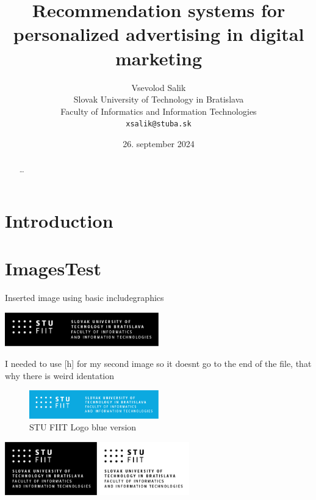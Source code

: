 \documentclass[10pt,twoside,english,a4paper]{article}
\title{Recommendation systems for personalized advertising in digital marketing} %
\author{Vsevolod Salik\\[2pt]
	{\small Slovak University of Technology in Bratislava }\\
	{\small Faculty of Informatics and Information Technologies }\\
	{\small \texttt{xsalik@stuba.sk}}
	}
\date{\small 26. september 2024} %
\begin{document}
\maketitle


\begin{abstract}
\ldots
\end{abstract}



\section{Introduction}


\section{ImagesTest}
\graphicspath{ {./images/PNG} }
Inserted image using basic includegraphics

\includegraphics[width=0.5\textwidth]{STU-FIIT-ancnh.png}

I needed to use [h] for my second image so it doesnt go to the end of the file, that why there is weird identation

\begin{figure}[h]
	\includegraphics[width=0.5\textwidth]{STU-FIIT-anfnh.png}
	\caption{STU FIIT Logo blue version}
	\label{logo_2}
\end{figure}

\hfil\includegraphics[width=0.3\textwidth]{STU-FIIT-ancnv.png}\hfil\includegraphics[width=0.3\textwidth]{STU-FIIT-ancv.png}
\end{document}
